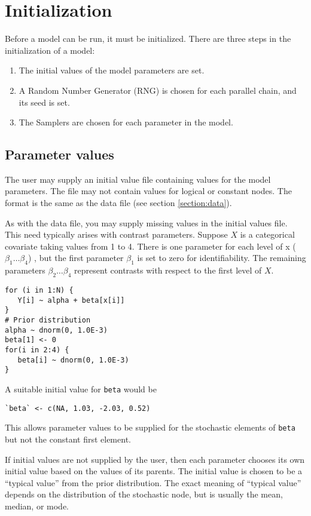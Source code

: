 \documentclass[11pt, a4paper, titlepage]{report}
\begin{document}
\section{Initialization}

Before a model can be run, it must be initialized. There are three
steps in the initialization of a model:
\begin{enumerate}
\item The initial values of the model parameters are set.
\item A Random Number Generator (RNG) is chosen for each parallel chain,
  and its seed is set.
\item The Samplers are chosen for each parameter in the model. 
\end{enumerate}

\subsection{Parameter values}

The user may supply an initial value file containing values for the
model parameters. The file may not contain values for logical or
constant nodes. The format is the same as the data file (see section
\ref{section:data}).

As with the data file, you may supply missing values in the initial
values file.  This need typically arises with contrast parameters.
Suppose $X$ is a categorical covariate taking values from 1 to
4. There is one parameter for each level of x ($\beta_1 \ldots
\beta_4$) , but the first parameter $\beta_1$ is set to zero for
identifiability. The remaining parameters $\beta_2 \ldots \beta_4$
represent contrasts with respect to the first level of $X$.
\begin{verbatim}
for (i in 1:N) {
   Y[i] ~ alpha + beta[x[i]]
}
# Prior distribution
alpha ~ dnorm(0, 1.0E-3)
beta[1] <- 0
for(i in 2:4) {
   beta[i] ~ dnorm(0, 1.0E-3)
}
\end{verbatim}
A suitable initial value for \verb+beta+ would be
\begin{verbatim}
`beta` <- c(NA, 1.03, -2.03, 0.52)
\end{verbatim}
This allows parameter values to be supplied for the stochastic
elements of \verb+beta+ but not the constant first element.

If initial values are not supplied by the user, then each parameter
chooses its own initial value based on the values of its parents.  The
initial value is chosen to be a ``typical value'' from the prior
distribution. The exact meaning of ``typical value'' depends on the
distribution of the stochastic node, but is usually the mean, median,
or mode.
\end{document}
